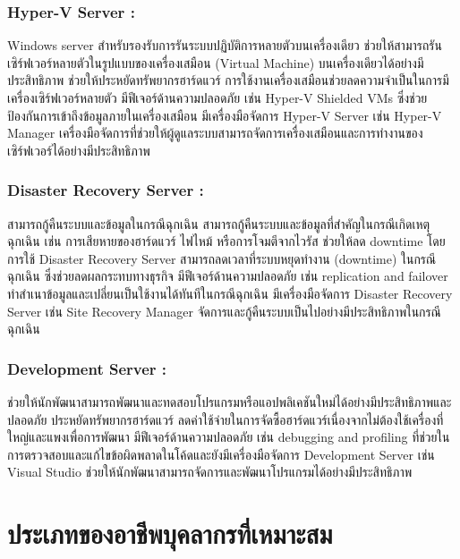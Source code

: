 \hspace{0cm}\subsubsection{Hyper-V Server : }Windows server สำหรับรองรับการรันระบบปฏิบัติการหลายตัวบนเครื่องเดียว  ช่วยให้สามารถรันเซิร์ฟเวอร์หลายตัวในรูปแบบของเครื่องเสมือน (Virtual Machine) บนเครื่องเดียวได้อย่างมีประสิทธิภาพ 
ช่วยให้ประหยัดทรัพยากรฮาร์ดแวร์ การใช้งานเครื่องเสมือนช่วยลดความจำเป็นในการมีเครื่องเซิร์ฟเวอร์หลายตัว 
มีฟีเจอร์ด้านความปลอดภัย เช่น Hyper-V Shielded VMs ซึ่งช่วยป้องกันการเข้าถึงข้อมูลภายในเครื่องเสมือน 
มีเครื่องมือจัดการ Hyper-V Server เช่น Hyper-V Manager เครื่องมือจัดการที่ช่วยให้ผู้ดูแลระบบสามารถจัดการเครื่องเสมือนและการทำงานของเซิร์ฟเวอร์ได้อย่างมีประสิทธิภาพ 

\hspace{0cm}\subsubsection{Disaster Recovery Server :}สามารถกู้คืนระบบและข้อมูลในกรณีฉุกเฉิน สามารถกู้คืนระบบและข้อมูลที่สำคัญในกรณีเกิดเหตุฉุกเฉิน เช่น การเสียหายของฮาร์ดแวร์ ไฟไหม้ หรือการโจมตีจากไวรัส 
ช่วยให้ลด downtime โดยการใช้ Disaster Recovery Server สามารถลดเวลาที่ระบบหยุดทำงาน (downtime) ในกรณีฉุกเฉิน ซึ่งช่วยลดผลกระทบทางธุรกิจ 
มีฟีเจอร์ด้านความปลอดภัย เช่น replication and failover ทำสำเนาข้อมูลและเปลี่ยนเป็นใช้งานได้ทันทีในกรณีฉุกเฉิน 
มีเครื่องมือจัดการ Disaster Recovery Server เช่น Site Recovery Manager จัดการและกู้คืนระบบเป็นไปอย่างมีประสิทธิภาพในกรณีฉุกเฉิน 

\hspace{0cm}\subsubsection{Development Server :}ช่วยให้นักพัฒนาสามารถพัฒนาและทดสอบโปรแกรมหรือแอปพลิเคชันใหม่ได้อย่างมีประสิทธิภาพและปลอดภัย ประหยัดทรัพยากรฮาร์ดแวร์ ลดค่าใช้จ่ายในการจัดซื้อฮาร์ดแวร์เนื่องจากไม่ต้องใช้เครื่องที่ใหญ่และแพงเพื่อการพัฒนา มีฟีเจอร์ด้านความปลอดภัย เช่น debugging and profiling ที่ช่วยในการตรวจสอบและแก้ไขข้อผิดพลาดในโค้ดและยังมีเครื่องมือจัดการ Development Server เช่น Visual Studio ช่วยให้นักพัฒนาสามารถจัดการและพัฒนาโปรแกรมได้อย่างมีประสิทธิภาพ 

\section{ประเภทของอาชีพบุคลากรที่เหมาะสม}

